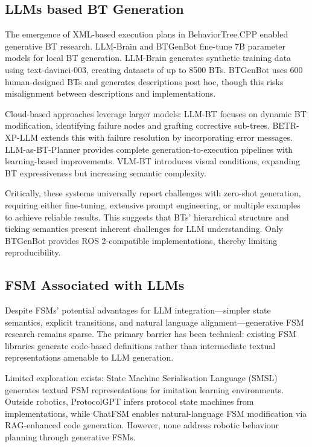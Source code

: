 \documentclass[letterpaper, 10pt, conference]{ieeeconf}      %
\begin{document}
\subsection{LLMs based BT Generation}

The emergence of XML-based execution plans in BehaviorTree.CPP enabled generative BT research. LLM-Brain \cite{lykov_llm-brain_2023} and BTGenBot \cite{izzo_btgenbot_2024} fine-tune 7B parameter models for local BT generation. LLM-Brain generates synthetic training data using text-davinci-003, creating datasets of up to 8500 BTs. BTGenBot uses 600 human-designed BTs and generates descriptions post hoc, though this risks misalignment between descriptions and implementations.

Cloud-based approaches leverage larger models: LLM-BT \cite{zhou_llm-bt_2024} focuses on dynamic BT modification, identifying failure nodes and grafting corrective sub-trees. BETR-XP-LLM \cite{styrud_automatic_2024} extends this with failure resolution by incorporating error messages. LLM-as-BT-Planner \cite{ao_llm-as-bt-planner_2025} provides complete generation-to-execution pipelines with learning-based improvements. VLM-BT \cite{wake_vlm-driven_2025} introduces visual conditions, expanding BT expressiveness but increasing semantic complexity.

Critically, these systems universally report challenges with zero-shot generation, requiring either fine-tuning, extensive prompt engineering, or multiple examples to achieve reliable results. This suggests that BTs' hierarchical structure and ticking semantics present inherent challenges for LLM understanding. Only BTGenBot \cite{izzo_btgenbot_2024} provides ROS 2-compatible implementations, thereby limiting reproducibility.

\subsection{FSM Associated with LLMs}

Despite FSMs' potential advantages for LLM integration—simpler state semantics, explicit transitions, and natural language alignment—generative FSM research remains sparse. The primary barrier has been technical: existing FSM libraries generate code-based definitions rather than intermediate textual representations amenable to LLM generation.

Limited exploration exists: State Machine Serialisation Language (SMSL) \cite{mu_look_2025} generates textual FSM representations for imitation learning environments. Outside robotics, ProtocolGPT \cite{wei_unleashing_2025} infers protocol state machines from implementations, while ChatFSM \cite{gan_can_2024} enables natural-language FSM modification via RAG-enhanced code generation. However, none address robotic behaviour planning through generative FSMs.
\end{document}
